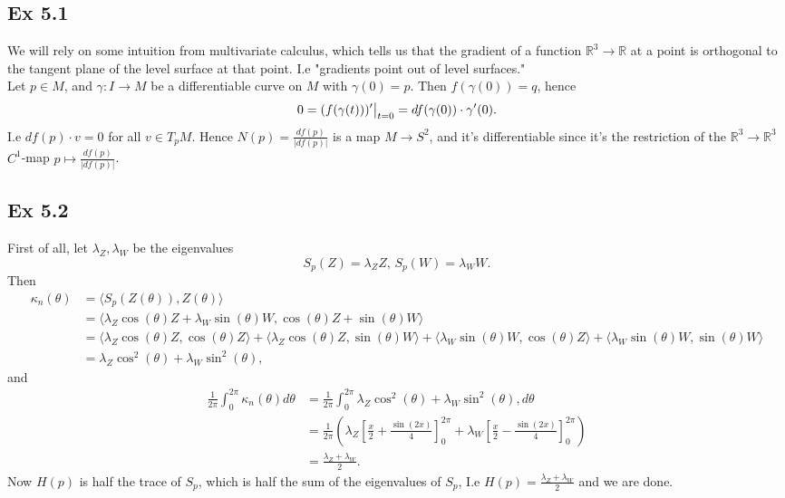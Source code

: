 \documentclass{article}
\newcommand\restr[2]{{%
  \left.\kern-\nulldelimiterspace %
  #1 %
  \vphantom{\big|} %
  \right|_{#2} %
  }}
\theoremstyle{definition}
\newcommand{\R}{\mathbb{R}}
\begin{document}
\subsection*{Ex 5.1}

We will rely on some intuition from multivariate calculus, which tells us that
the gradient of a function $\R^3 \to \R$ at a point is orthogonal to the
tangent plane of the level surface at that point. I.e "gradients point out of
level surfaces." \\

Let $p \in M$, and $\gamma : I \to M$ be a differentiable curve on $M$
with $\gamma(0) = p$. Then $f(\gamma(0)) = q$, hence 
\[
	0
	=
	\restr{(f(\gamma(t)))'}{t = 0}
	=
	df(\gamma(0)) \cdot \gamma'(0).
\] 
I.e $df(p) \cdot v = 0$ for all $v \in T_{p}M$. Hence $N(p) =
\frac{df(p)}{|df(p)|}$ is a map $M \to S^2$, and it's differentiable since it's
the restriction of the $\R^3 \to \R^3$ $C^1$-map $p \mapsto
\frac{df(p)}{|df(p)|}$.

\subsection*{Ex 5.2}

First of all, let $\lambda_Z, \lambda_W$ be the eigenvalues 
\[
	S_p(Z) = \lambda_Z Z, \, 
	S_p(W) = \lambda_W W.
\] 
Then 
\begin{align*}
	\kappa_{n}(\theta)
	&=
	\langle S_p(Z(\theta)), Z(\theta) \rangle \\
	&=
	\langle \lambda_Z \cos(\theta) Z + \lambda_W \sin(\theta) W, \cos(\theta) Z + \sin(\theta) W \rangle \\
	&=
	\langle
		\lambda_Z \cos(\theta) Z,
		\cos(\theta) Z
	\rangle
	+
	\langle
		\lambda_Z \cos(\theta) Z,
		\sin(\theta) W
	\rangle
	+
	\langle
		\lambda_W \sin(\theta) W,
		\cos(\theta) Z 
	\rangle
	+
	\langle
		\lambda_W \sin(\theta) W,
		\sin(\theta) W
	\rangle \\
	&=
	\lambda_Z \cos^2(\theta)
	+
	\lambda_W \sin^2(\theta),
\end{align*}
and 
\begin{align*}
	\frac{1}{2\pi}
	\int_{0}^{2\pi}
	\kappa_n(\theta)
	d \theta
	&=
	\frac{1}{2\pi}
	\int_{0}^{2\pi}
	\lambda_Z \cos^2(\theta)
	+
	\lambda_W \sin^2(\theta),
	d \theta \\
	&=
	\frac{1}{2\pi}\left(
		\lambda_Z 
		\left[
			\frac{x}{2}
			+
			\frac{\sin(2x)}{4}
		\right]_{0}^{2\pi}
		+
		\lambda_W 
		\left[
			\frac{x}{2}
			-
			\frac{\sin(2x)}{4}
		\right]_{0}^{2\pi}
	\right) \\
	&=
	\frac{\lambda_Z + \lambda_W}{2}.
\end{align*}
Now $H(p)$ is half the trace of $S_p$, which is half the sum of the eigenvalues
of $S_p$, I.e $H(p) = \frac{\lambda_Z + \lambda_W}{2}$ and we are done.
\end{document}
